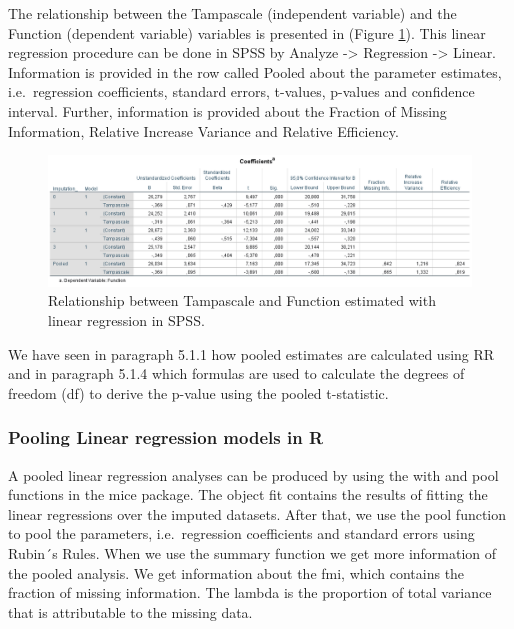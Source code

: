 \documentclass[]{book}
\theoremstyle{definition}
\theoremstyle{definition}
\theoremstyle{definition}
\theoremstyle{remark}
\begin{document}
The relationship between the Tampascale (independent variable) and the
Function (dependent variable) variables is presented in (Figure
\ref{fig:tab5-8}). This linear regression procedure can be done in SPSS
by Analyze -\textgreater{} Regression -\textgreater{} Linear.
Information is provided in the row called Pooled about the parameter
estimates, i.e.~regression coefficients, standard errors, t-values,
p-values and confidence interval. Further, information is provided about
the Fraction of Missing Information, Relative Increase Variance and
Relative Efficiency.

\begin{figure}

{\centering \includegraphics[width=0.9\linewidth]{images/table5.8} 

}

\caption{Relationship between Tampascale and Function estimated with linear regression in SPSS.}\label{fig:tab5-8}
\end{figure}

We have seen in paragraph 5.1.1 how pooled estimates are calculated
using RR and in paragraph 5.1.4 which formulas are used to calculate the
degrees of freedom (df) to derive the p-value using the pooled
t-statistic.

\subsubsection{Pooling Linear regression models in
R}\label{pooling-linear-regression-models-in-r}

A pooled linear regression analyses can be produced by using the with
and pool functions in the mice package. The object fit contains the
results of fitting the linear regressions over the imputed datasets.
After that, we use the pool function to pool the parameters,
i.e.~regression coefficients and standard errors using Rubin´s Rules.
When we use the summary function we get more information of the pooled
analysis. We get information about the fmi, which contains the fraction
of missing information. The lambda is the proportion of total variance
that is attributable to the missing data.
\end{document}
